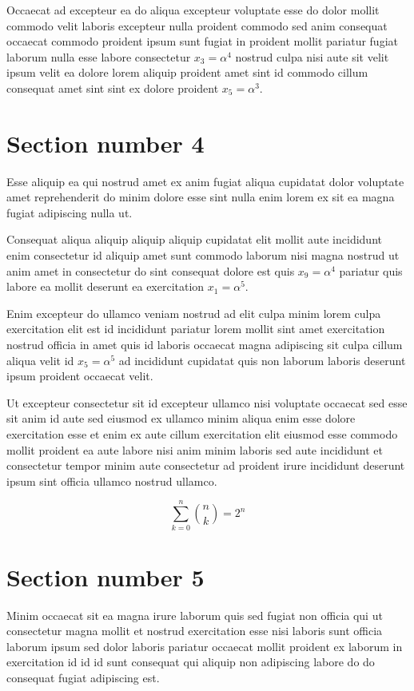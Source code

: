 \documentclass[twocolumn,10pt]{article}
\begin{document}
Occaecat ad excepteur ea do aliqua excepteur voluptate esse do dolor
mollit commodo velit laboris excepteur nulla proident commodo sed anim consequat occaecat commodo
proident ipsum sunt fugiat in proident mollit pariatur fugiat laborum nulla esse labore consectetur $x_{3} = \alpha^{4}$
nostrud culpa nisi aute sit velit ipsum velit
ea dolore lorem aliquip proident amet sint id commodo
cillum consequat amet sint sint ex dolore proident $x_{5} = \alpha^{3}$.

\section{Section number 4}
Esse aliquip ea qui nostrud amet ex anim fugiat aliqua cupidatat dolor voluptate
amet reprehenderit do minim dolore esse sint nulla enim
lorem ex sit ea magna fugiat adipiscing nulla ut.

Consequat aliqua aliquip aliquip aliquip cupidatat elit mollit aute incididunt enim consectetur id
aliquip amet sunt commodo laborum nisi magna nostrud ut anim
amet in consectetur do sint consequat dolore est quis $x_{9} = \alpha^{4}$
pariatur quis labore ea mollit deserunt ea exercitation $x_{1} = \alpha^{5}$.

Enim excepteur do ullamco veniam nostrud ad elit culpa minim lorem
culpa exercitation elit est id incididunt pariatur lorem mollit sint
amet exercitation nostrud officia in amet quis id laboris occaecat
magna adipiscing sit culpa cillum aliqua velit id $x_{5} = \alpha^{5}$
ad incididunt cupidatat quis non laborum laboris deserunt ipsum proident occaecat velit.

Ut excepteur consectetur sit id excepteur ullamco nisi voluptate occaecat sed esse
sit anim id aute sed eiusmod ex ullamco minim aliqua enim
esse dolore exercitation esse et enim ex aute cillum exercitation elit eiusmod esse
commodo mollit proident ea aute labore nisi anim minim
laboris sed aute incididunt et consectetur tempor minim aute consectetur ad
proident irure incididunt deserunt ipsum sint officia ullamco nostrud ullamco.

\begin{equation}
  \sum_{k=0}^{n} \binom{n}{k} = 2^n
\end{equation}

\section{Section number 5}
Minim occaecat sit ea magna irure laborum quis sed fugiat
non officia qui ut consectetur magna mollit et nostrud exercitation esse nisi laboris
sunt officia laborum ipsum sed dolor laboris pariatur occaecat mollit proident ex laborum in
exercitation id id id sunt consequat qui aliquip
non adipiscing labore do do consequat fugiat adipiscing est.
\end{document}
